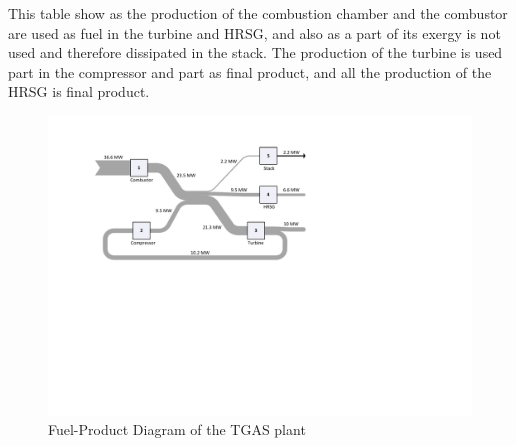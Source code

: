 \documentclass{ecos2018}
\begin{document}
This table show as the production of the combustion chamber and the combustor are used as fuel in the turbine and HRSG, and also as a part of its exergy is not used and therefore dissipated in the stack. The production of the turbine is used part in the compressor and part as final product, and all the production of the HRSG is final product. 

\begin{figure}[H]
\includegraphics[width=0.85\linewidth]{tgasfp_exergy}
\caption{Fuel-Product Diagram of the TGAS plant}
\label{fig1}
\end{figure}
\end{document}
